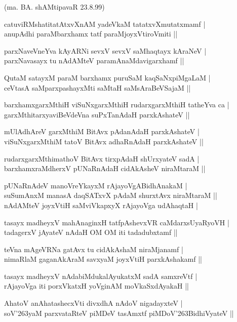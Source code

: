 \begin{itemize}
{\hfill{(ma. BA. shAMtipavaR 23.8.99)}
\item[36.] catuviRMshatitatAtxvXnAM yadeVkaM tatatxvXmutatxmamf |\\\label{150}
anupAdhi paraMbarxhamx tatf paraMjoyxVtiroVmiti ||
\item[37.] parxNaveVneYva kAyARNi sevxV sevxV saMhaqtayx kAraNeV |\\\label{150}
parxNavasayx tu nAdAMteV paramAnaMdavigarxhamf ||
\item[38.] QutaM satayxM paraM barxhamx puruSaM kaqSaNxpiMgaLaM |\\\label{150}
ceVtasA saMparxpashayxMti saMtaH saMsAraBeVSajaM ||
\item[39.] barxhamxgarxMthiH viSuNxgarxMthiH rudarxgarxMthiH tatheYva ca |\\\label{150}
garxMthitarxyaviBeVdeVna suPxTanAdaH parxkAshateV ||
\item[40.] mUlAdhAreV garxMthiM BitAvx pAdanAdaH parxkAshateV |\\
viSuNxgarxMthiM tatoV BitAvx adhaRnAdaH parxkAshateV ||
\item[41.] rudarxgarxMthimathoV BitAvx tirxpAdaH shUrxyateV sadA |\\
barxhamxraMdherxV pUNaRnAdaH cidAkAsheV niraMtaraM ||
\item[42.] pUNaRnAdeV manoVreYkayxM rAjayoVgABidhAnakaM |\\
suSumAnxM manasA daqSATxvX pAdaM shurxtAvx niraMtaraM ||\\
nAdAMteV joyxVtiH saMviVkapxyX rAjayoVga udAhaqtaH |
\item[43.] tasayx madheyxV mahAnaginxH tatfpAshevxVR caMdarxsUyaRyoVH |\\\label{150}
tadagerxV jAyateV nAdaH OM OM iti tadadubxtamf ||
\item[44.] teVna mAgeVRNa gatAvx tu cidAkAshaM niraMjanamf |\\
nimaRlaM gaganAkAraM savxyaM joyxVtiH parxkAshakamf ||
\item[45.] tasayx madheyxV nAdabiMdukalAyukatxM sadA samxreVtf |\\
rAjayoVga iti porxVkatxH yoVginAM moVkaSxdAyakaH ||
\item[46.] AhatoV anAhatashecxVti divxdhA nAdoV nigadayxteV |\\\label{150}
soV\char'263yaM parxvataRteV piMDeV tasAmxtf piMDoV\char'263BidhiVyateV ||

}
\end{itemize}
